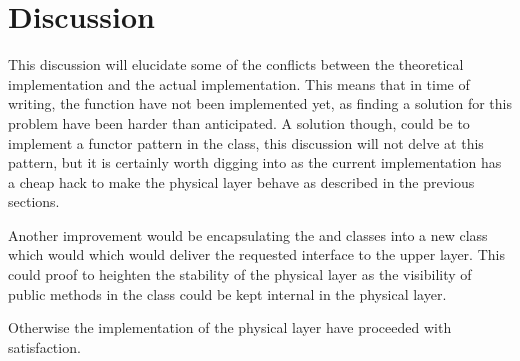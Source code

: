 \section{Discussion}
This discussion will elucidate some of the conflicts between the theoretical implementation and the actual implementation. This means that in time of writing, the  function have not been implemented yet, as finding a solution for this problem have been harder than anticipated. A solution though, could be to implement a functor pattern in the  class, this discussion will not delve at this pattern, but it is certainly worth digging into as the current implementation has a cheap hack to make the physical layer behave as described in the previous sections.

Another improvement would be encapsulating the  and  classes into a new class which would which would deliver the requested interface to the upper layer. This could proof to heighten the stability of the physical layer as the visibility of public methods in the  class could be kept internal in the physical layer.

Otherwise the implementation of the physical layer have proceeded with satisfaction.